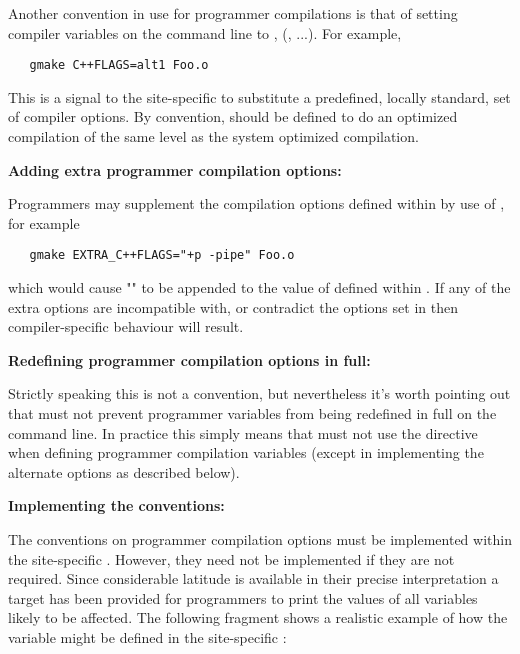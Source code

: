 Another convention in use for programmer compilations is that of setting
compiler  variables on the command line to ,
(, ...).  For example,
 
\begin{verbatim}
   gmake C++FLAGS=alt1 Foo.o
\end{verbatim}
 
\noindent
This is a signal to the site-specific  to substitute a
predefined, locally standard, set of compiler options.  By convention,
 should be defined to do an optimized compilation of the same level
as the system optimized compilation.
 
\textbf{Adding extra programmer compilation options:}
 
Programmers may supplement the compilation options defined within
 by use of , for example
 
\begin{verbatim}
   gmake EXTRA_C++FLAGS="+p -pipe" Foo.o
\end{verbatim}
 
\noindent
which would cause "" to be appended to the value of
 defined within .  If any of the extra options
are incompatible with, or contradict the options set in  then
compiler-specific behaviour will result.
 
\textbf{Redefining programmer compilation options in full:}
 
Strictly speaking this is not a  convention, but nevertheless
it's worth pointing out that  must not prevent programmer
variables from being redefined in full on the  command line.  In
practice this simply means that  must not use the
 directive when defining programmer compilation variables
(except in implementing the alternate options as described below).
 
\textbf{Implementing the conventions:}
 
The conventions on programmer compilation options must be implemented within
the site-specific .  However, they need not be implemented if
they are not required.  Since considerable latitude is available in their
precise interpretation a  target has been provided for
programmers to print the values of all variables likely to be affected.  The
following fragment shows a realistic example of how the 
variable might be defined in the site-specific :
 
